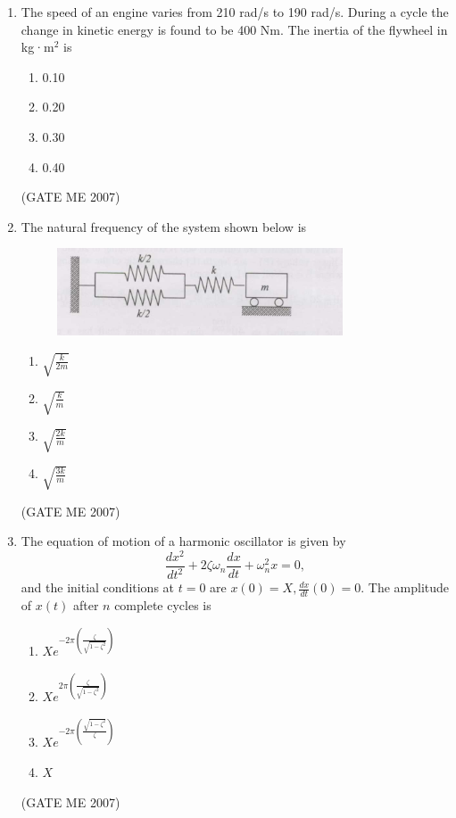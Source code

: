 \documentclass[journal]{IEEEtran}
\begin{document}
\begin{enumerate}
\item The speed of an engine varies from 210 rad/s to 190 rad/s. During a cycle the change in kinetic energy is found to be 400 Nm. The inertia of the flywheel in kg·m\(^2\) is
\begin{multicols}{4}
\begin{enumerate}
\item 0.10
\item 0.20
\item 0.30
\item 0.40
\end{enumerate}
\end{multicols}
\hfill (GATE ME 2007)

\item The natural frequency of the system shown below is

\begin{figure}[H]
    \centering
    \includegraphics[width=0.8\textwidth]{Fig 8.png}
    \caption{}
    \label{fig:question52}
\end{figure}

\begin{multicols}{4}
\begin{enumerate}
\item \( \sqrt{\frac{k}{2m}} \)
\item \( \sqrt{\frac{k}{m}} \)
\item \( \sqrt{\frac{2k}{m}} \)
\item \( \sqrt{\frac{3k}{m}} \)
\end{enumerate}
\end{multicols}
\hfill (GATE ME 2007)

\item The equation of motion of a harmonic oscillator is given by  
\[\frac{dx^2}{dt^2} + 2\zeta \omega_n \frac{dx}{dt} + \omega_n^2 x = 0,\]  
and the initial conditions at \( t = 0 \) are \( x(0) = X, \frac{dx}{dt}(0) = 0 \). The amplitude of \( x(t) \) after \( n \) complete cycles is

\begin{multicols}{2}
\begin{enumerate}
\item \( Xe^{-2\pi \left( \frac{\zeta}{\sqrt{1 - \zeta^2}} \right)} \)
\item \( Xe^{2\pi \left( \frac{\zeta}{\sqrt{1 - \zeta^2}} \right)} \)
\item \( Xe^{-2\pi \left( \frac{\sqrt{1 - \zeta^2}}{\zeta} \right)} \)
\item \( X \)
\end{enumerate}
\end{multicols}
\hfill (GATE ME 2007)


\end{enumerate}
\end{document}
